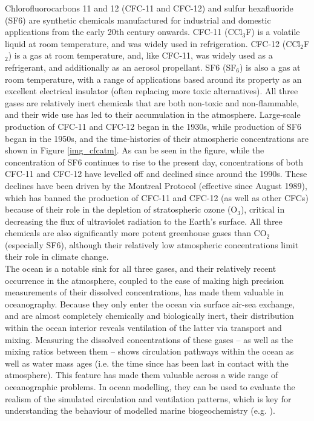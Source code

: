 \documentclass[../main/TOP_manual]{subfiles}
\begin{document}
%

Chlorofluorocarbons 11 and 12 (CFC-11 and CFC-12) and sulfur hexafluoride (SF6) are synthetic chemicals manufactured for industrial and domestic applications from the early 20th century onwards.
CFC-11 (CCl$_{3}$F) is a volatile liquid at room temperature, and was widely used in refrigeration.
CFC-12 (CCl$_{2}$F$_{2}$) is a gas at room temperature, and, like CFC-11, was widely used as a refrigerant,
and additionally as an aerosol propellant.
SF6 (SF$_{6}$) is also a gas at room temperature, with a range of applications based around its property as an excellent electrical insulator (often replacing more toxic alternatives).
All three gases are relatively inert chemicals that are both non-toxic and non-flammable, and their wide use has led to their accumulation in the atmosphere.
Large-scale production of CFC-11 and CFC-12 began in the 1930s, while production of SF6 began in the 1950s, and the time-histories of their atmospheric concentrations are shown in Figure \autoref{img_cfcatm}.
As can be seen in the figure, while the concentration of SF6 continues to rise to the present day, concentrations of both CFC-11 and CFC-12 have levelled off and declined since around the 1990s.
These declines have been driven by the Montreal Protocol (effective since August 1989), which has banned the production of CFC-11 and CFC-12 (as well as other CFCs) because of their role in the depletion of
stratospheric ozone (O$_{3}$), critical in decreasing the flux of ultraviolet radiation to the Earth's surface. All three chemicals are also  significantly more potent greenhouse gases
than CO$_{2}$ (especially SF6), although their relatively low atmospheric concentrations limit their role in climate change. \\

The ocean is a notable sink for all three gases, and their relatively recent occurrence in the atmosphere, coupled to the ease of making high precision measurements of their dissolved concentrations, has made them
valuable in oceanography. %
Because they only enter the ocean via surface air-sea exchange, and are almost completely chemically and biologically inert, their distribution within the ocean interior reveals ventilation of the latter via transport and mixing.
Measuring the dissolved concentrations of these gases -- as well as the mixing ratios between them -- shows circulation pathways within the ocean as well as water mass ages (i.e. the time since has been last in contact with the
atmosphere).
This feature has made them valuable across a wide range of oceanographic problems.
In ocean modelling, they can be used to evaluate the realism of the simulated circulation and
ventilation patterns, which is key for understanding the behaviour of modelled marine biogeochemistry (e.g. \citep{dutay_2002,palmieri_2015}). \\
\end{document}
